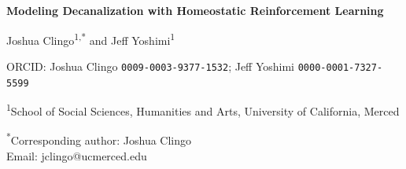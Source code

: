 \documentclass[12pt,fleqn]{article}
\begin{document}
\begin{titlepage}
  \centering
  \vspace*{2cm}
  {\LARGE\bfseries Modeling Decanalization with Homeostatic Reinforcement Learning\par}
  \vspace{2cm}
  {\large
    Joshua Clingo\textsuperscript{1,*} and Jeff Yoshimi\textsuperscript{1}\par
  }
  \vspace{0.5cm}
  {\small
    ORCID: Joshua Clingo \texttt{0009-0003-9377-1532}; Jeff Yoshimi \texttt{0000-0001-7327-5599}\par
  }
  \vspace{1cm}
  {\normalsize
    \textsuperscript{1}School of Social Sciences, Humanities and Arts, University of California, Merced\par
  }
  \vspace{1cm}
  {\normalsize
    \textsuperscript{*}Corresponding author: Joshua Clingo\\
    Email: jclingo@ucmerced.edu\par
  }
  \vfill
\end{titlepage}


\begin{abstract}

  Living organisms continuously manage their homeostatic setpoints but sometimes fall into the ruts and grooves of an entrenched or canalized behavioral repertoire. Clinicians employ interventions, from psychoactive drugs to targeted stimulus regimes, to transiently decanalize entrenched behaviors and support more adaptive patterns. We test these ideas with a computational model in which canalization is learned: a foraging agent builds a cognitive map and becomes increasingly confident about where food is. Policies were trained with a homeostatic reinforcement learning (HRL) objective or a one-sided negative-feedback (NF) objective in a stable world. We then compared how they coped when the world changed: familiar resources degraded and better ones appeared elsewhere. We tested whether decanalization (temporarily less confident beliefs and more random choices) followed by recanalization improved on continued canalization. Under continued canalization, most HRL agents became trapped, returning to failing resources. Decanalization helped trapped agents find the new resources sooner and regulate better. HRL agents benefited significantly more than NF agents.

\end{abstract}
\end{document}
